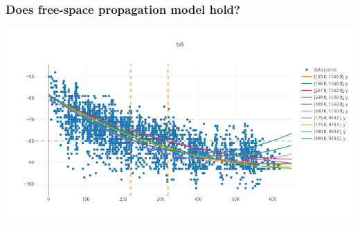 \documentclass{beamer}
\begin{document}
\begin{frame}
\frametitle{Does free-space propagation model hold?}
\includegraphics[width=\linewidth]{images/different_directions.png}
\end{frame}
\end{document}
